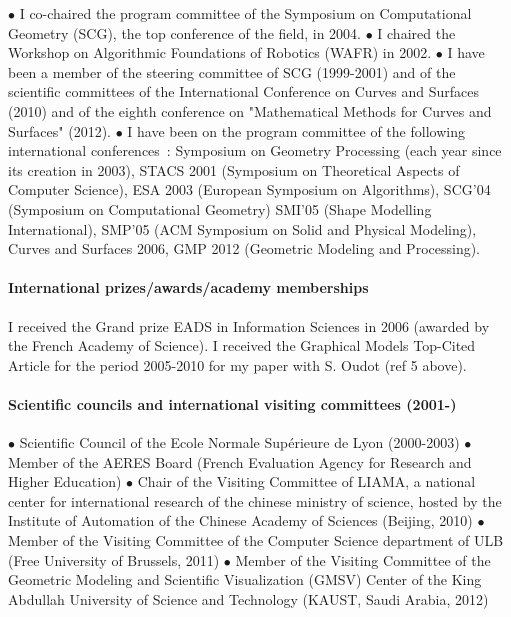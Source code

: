 
$\bullet$ I co-chaired the program committee of the  Symposium on Computational Geometry (SCG), the top conference of the field,  in 2004.
$\bullet$ 
I chaired the Workshop on Algorithmic Foundations of Robotics (WAFR) in 2002.
$\bullet$ 
I have been a member of the steering committee of SCG  (1999-2001) and of the scientific committees of the International Conference on Curves and Surfaces (2010) and of  the eighth conference on "Mathematical Methods for Curves and Surfaces" (2012).
$\bullet$ 
I have been on the program committee of  the following international conferences~: Symposium on Geometry Processing (each year since its creation in 2003), 
STACS 2001 (Symposium on Theoretical Aspects of Computer Science),
ESA 2003 (European Symposium on Algorithms),
SCG'04 (Symposium on Computational Geometry)
SMI'05 (Shape Modelling International),
SMP'05 (ACM Symposium on Solid and Physical Modeling),
Curves and Surfaces 2006,
GMP 2012 (Geometric Modeling 
and Processing).

\paragraph{International prizes/awards/academy memberships} \mbox{}
I received the Grand prize EADS in Information Sciences in 2006 (awarded by the French Academy of Science).  I received the Graphical Models Top-Cited Article for the period 2005-2010 for  my paper with S. Oudot (ref 5 above).

\paragraph{Scientific councils and international visiting committees (2001-)} \mbox{}


$\bullet$  Scientific Council of the Ecole Normale Sup\'erieure de Lyon (2000-2003)
$\bullet$  Member of the AERES Board (French Evaluation Agency for
  Research and Higher Education)
$\bullet$  Chair of the Visiting Committee of LIAMA, a  national center for international research of the chinese ministry of science, hosted by the Institute of Automation of the Chinese Academy of Sciences  (Beijing, 2010)
$\bullet$  Member of the Visiting Committee of the Computer Science department of ULB (Free University of Brussels, 2011)
$\bullet$    Member of the Visiting Committee of the Geometric Modeling and Scientific Visualization (GMSV) Center of the King Abdullah University of Science and Technology (KAUST, Saudi Arabia, 2012)



